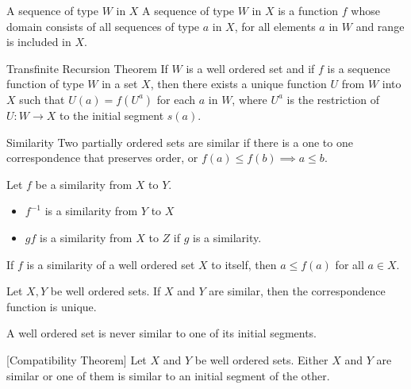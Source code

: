 \documentclass[a4paper]{article}
\begin{document}
\begin{defn}{A sequence of type $W$ in $X$}{} A sequence of type $W$ in $X$ is a function $f$ whose domain consists of all sequences of type $a$ in $X$, for all elements $a$ in $W$ and range is included in $X$. 
\end{defn}

\begin{thm}{Transfinite Recursion Theorem}{} If $W$ is a well ordered set and if $f$ is a sequence function of type $W$ in a set $X$, then there exists a unique function $U$ from $W$ into $X$ such that $U(a)=f(U^a)$ for each $a$ in $W$, where $U^a$ is the restriction of $U:W\to X$ to the initial segment $s(a)$. 
\end{thm}

\begin{defn}{Similarity}{} Two partially ordered sets are similar if there is a one to one correspondence that preserves order, or $f(a)\leq f(b)\implies a\leq b$. 
\end{defn}

\begin{prp}{}{} Let $f$ be a similarity from $X$ to $Y$. 
\begin{itemize}
\item $f^{-1}$ is a similarity from $Y$ to $X$
\item $gf$ is a similarity from $X$ to $Z$ if $g$ is a similarity. 
\end{itemize}
\end{prp}

\begin{thm}{}{} If $f$ is a similarity of a well ordered set $X$ to itself, then $a\leq f(a)$ for all $a\in X$. 
\end{thm}

\begin{thm}{}{} Let $X,Y$ be well ordered sets. If $X$ and $Y$ are similar, then the correspondence function is unique. 
\end{thm}

\begin{thm}{}{} A well ordered set is never similar to one of its initial segments. 
\end{thm}

\begin{thm}{}{}[Compatibility Theorem] Let $X$ and $Y$ be well ordered sets. Either $X$ and $Y$ are similar or one of them is similar to an initial segment of the other. 
\end{thm}

\pagebreak
\end{document}

